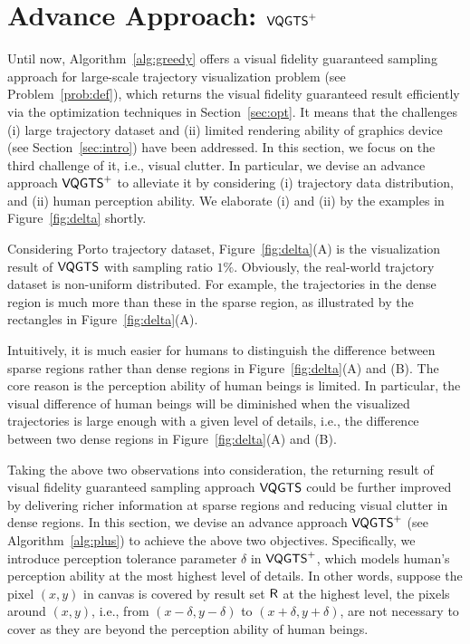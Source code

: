 \section{Advance Approach: $\mathsf{VQGTS}^{+}$}\label{sec:aa}
Until now, Algorithm~\ref{alg:greedy} offers a visual fidelity guaranteed sampling approach for large-scale trajectory visualization problem (see Problem~\ref{prob:def}),
which returns the visual fidelity guaranteed result efficiently via the optimization techniques in Section~\ref{sec:opt}.
It means that the challenges (i) large trajectory dataset and (ii) limited rendering ability of graphics device (see Section~\ref{sec:intro}) have been addressed.
In this section, we focus on the third challenge of it, i.e.,  visual clutter.
In particular, we devise an advance approach $\mathsf{VQGTS}^{+}$ to alleviate it by considering
(i) trajectory data distribution, and (ii) human perception ability.
We elaborate (i) and (ii) by the examples in Figure~\ref{fig:delta} shortly.

 Considering Porto trajectory dataset, Figure~\ref{fig:delta}(A) is the visualization result of $\mathsf{VQGTS}$ with sampling ratio $1\%$.
Obviously, the real-world trajctory dataset is non-uniform distributed.
For example, the trajectories in the dense region is much more than these in the sparse region, as illustrated by the rectangles in Figure~\ref{fig:delta}(A).

 Intuitively, it is much easier for humans to distinguish the difference between sparse regions rather than dense regions in Figure~\ref{fig:delta}(A) and (B).
The core reason is the perception ability of human beings is limited.
In particular, the visual difference of human beings will be diminished when the visualized trajectories is large enough with a given level of details,
i.e., the difference between two dense regions in Figure~\ref{fig:delta}(A) and (B).

Taking the above two observations into consideration, the returning result of visual fidelity guaranteed sampling approach $\mathsf{VQGTS}$ could be further improved by
delivering richer information at sparse regions and reducing visual clutter in dense regions.
In this section, we devise an advance approach $\mathsf{VQGTS}^{+}$ (see Algorithm~\ref{alg:plus}) to achieve the above two objectives.
Specifically, we introduce perception tolerance parameter $\delta$ in $\mathsf{VQGTS}^{+}$, which models human's perception ability at the most highest level of details.
In other words, suppose the pixel $(x,y)$ in canvas is covered by result set $\mathsf{R}$ at the highest level,
the pixels around $(x,y)$, i.e., from $(x-\delta, y-\delta)$ to $(x+\delta, y+\delta)$, are not necessary to cover as they are beyond the perception ability of human beings.



